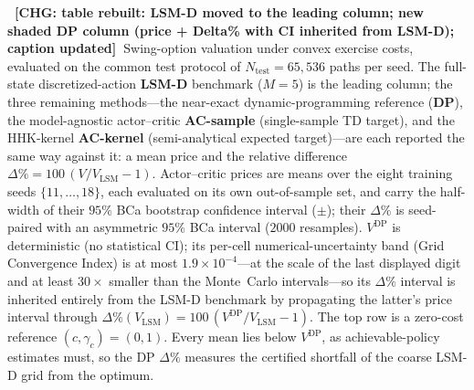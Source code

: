 \documentclass[a4paper,fleqn]{cas-dc}
\newcommand{\hlc}[1]{\colorbox{chgyellow}{#1}}
\newcommand{\dpvhl}{\cellcolor{chgyellow}}
\newcommand{\hlc}[1]{#1}
\newcommand{\dpvhl}{}
\newcommand{\chg}[1]{{\normalfont\bfseries\color{red}~[CHG: \textsf{\footnotesize #1}]~}}
\newcommand{\chg}[1]{}
\begin{document}
\newcommand{\dpct}[4]{\cellcolor{#1}$#2$\,{\scriptsize$[#3,\,#4]$}}
\newcommand{\dpv}[1]{\dpvhl$#1$}
\newcommand{\pmci}[2]{$#1$\,{\scriptsize$\pm#2$}}
\begin{table}[htbp]
    \centering
    \caption{\chg{table rebuilt: LSM-D moved to the leading column; new shaded DP column (price + Delta\% with CI inherited from LSM-D); caption updated}\hlc{Swing-option valuation under convex exercise costs}, evaluated on the common test protocol of $N_{\mathrm{test}}=65{,}536$ paths per seed. The full-state discretized-action \textbf{LSM-D} benchmark ($M=5$) is the leading column; the three remaining methods---the near-exact dynamic-programming reference (\textbf{DP}), the model-agnostic actor--critic \textbf{AC-sample} (single-sample TD target), and the HHK-kernel \textbf{AC-kernel} (semi-analytical expected target)---are each reported the same way against it: a mean price and the relative difference $\Delta\% = 100\,(V/V_{\mathrm{LSM}}-1)$. Actor--critic prices are means over the eight training seeds $\{11,\dots,18\}$, each evaluated on its own out-of-sample set, and carry the half-width of their $95\%$ BCa bootstrap confidence interval ($\pm$); their $\Delta\%$ is seed-paired with an asymmetric $95\%$ BCa interval ($2000$ resamples). $V^{\mathrm{DP}}$ is deterministic (no statistical CI); its per-cell numerical-uncertainty band (Grid Convergence Index) is at most $1.9\times10^{-4}$---at the scale of the last displayed digit and at least $30\times$ smaller than the Monte~Carlo intervals---so its $\Delta\%$ interval is inherited entirely from the LSM-D benchmark by propagating the latter's price interval through $\Delta\%(V_{\mathrm{LSM}})=100\,(V^{\mathrm{DP}}/V_{\mathrm{LSM}}-1)$. The top row is a zero-cost reference $(c,\gamma_c)=(0,1)$. Every mean lies below $V^{\mathrm{DP}}$, as achievable-policy estimates must, so the DP $\Delta\%$ measures the certified shortfall of the coarse LSM-D grid from the optimum.}
    \label{tab:results}
    \begin{adjustbox}{max width=\linewidth}

\end{adjustbox}
\end{table}
\end{document}
